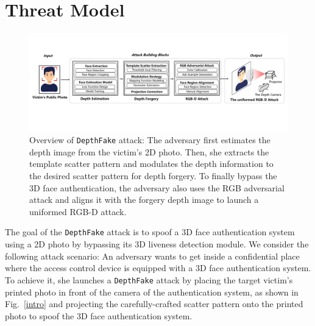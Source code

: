 \section{Threat Model}


\begin{figure}[pt]
	\centerline{\includegraphics[width = \textwidth]{figures/overview.pdf}}
	\vspace{-0.1in}
	\caption{Overview of \texttt{DepthFake} attack: The adversary first estimates the depth image from the victim's 2D photo. Then, she extracts the template scatter pattern and modulates the depth information to the desired scatter pattern for depth forgery. To finally bypass the 3D face authentication, the adversary also uses the RGB adversarial attack and aligns it with the forgery depth image to launch a uniformed RGB-D attack.}
	\label{overview}
	\vspace{-0.15in}
\end{figure}

The goal of the \texttt{DepthFake} attack is to spoof a 3D face authentication system using a 2D photo by bypassing its 3D liveness detection module. We consider the following attack scenario: An adversary wants to get inside a confidential place where the access control device is equipped with  a 3D face authentication system. To achieve it, she launches a \texttt{DepthFake} attack by placing the target victim's printed photo in front of the camera of the authentication system, as shown in Fig.~\ref{intro} and projecting the carefully-crafted scatter pattern onto the printed photo to spoof the 3D face authentication system.
%
%


